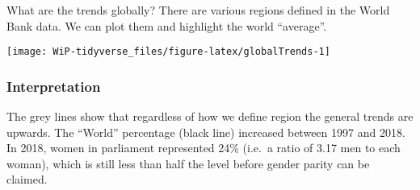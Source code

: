 \documentclass[a4paper,9pt,twocolumn,twoside,]{pinp}
\begin{document}
What are the trends globally? There are various regions defined in the
World Bank data. We can plot them and highlight the world ``average''.

\begin{Shaded}
\end{Shaded}

\begin{center}\texttt{[image: WiP-tidyverse\_files/figure-latex/globalTrends-1]} \end{center}

\hypertarget{interpretation-5}{%
\subsubsection{Interpretation}\label{interpretation-5}}

The grey lines show that regardless of how we define region the general
trends are upwards. The ``World'' percentage (black line) increased
between 1997 and 2018. In 2018, women in parliament represented 24\%
(i.e.~a ratio of 3.17 men to each woman), which is still less than half
the level before gender parity can be claimed.
\end{document}
